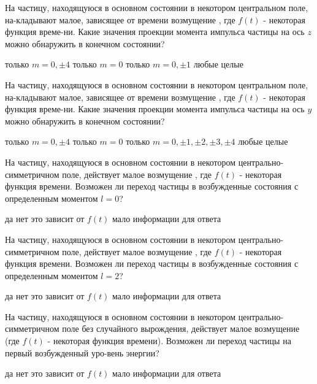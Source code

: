 \documentclass[11pt,a4paper]{exam}
\begin{document}
\begin{questions}
\question На частицу, находящуюся в основном состоянии в некотором центральном поле, на-кладывают малое, зависящее от времени возмущение , где $f(t)$ - некоторая функция време-ни. Какие значения проекции момента импульса частицы на ось $z$ можно обнаружить в конечном состоянии?
\begin{choices}
\choice только $m = 0, \pm 4$      
\choice только $m = 0$
\choice только $m = 0, \pm 1$      
\choice любые целые
\end{choices}

\question На частицу, находящуюся в основном состоянии в некотором центральном поле, на-кладывают малое, зависящее от времени возмущение , где $f(t)$ - некоторая функция време-ни. Какие значения проекции момента импульса частицы на ось $y$ можно обнаружить в конечном состоянии?
\begin{choices}
\choice только $m = 0, \pm 4$         
\choice только $m = 0$
\choice только $m = 0, \pm 1, \pm 2, \pm 3, \pm 4$   
\choice любые целые
\end{choices}

\question На частицу, находящуюся в основном состоянии в некотором центрально-симметричном поле, действует малое возмущение , где $f(t)$ - некоторая функция времени. Возможен ли переход частицы в возбужденные состояния с определенным моментом $l = 0$?  
\begin{choices}
\choice да    
\choice нет      
\choice это зависит от $f(t)$   
\choice мало информации для ответа
\end{choices}

\question На частицу, находящуюся в основном состоянии в некотором центрально-симметричном поле, действует малое возмущение , где $f(t)$ - некоторая функция времени. Возможен ли переход частицы в возбужденные состояния с определенным моментом $l = 2$? 
\begin{choices}
\choice да    
\choice нет      
\choice это зависит от $f(t)$   
\choice мало информации для ответа
\end{choices}

\question На частицу, находящуюся в основном состоянии в некотором центрально-симметричном поле без случайного вырождения, действует малое возмущение  (где $f(t)$ - некоторая функция времени). Возможен ли переход частицы на первый возбужденный уро-вень энергии?  
\begin{choices}
\choice да    
\choice нет      
\choice это зависит от $f(t)$   
\choice мало информации для ответа
\end{choices}


\end{questions}
\end{document}
